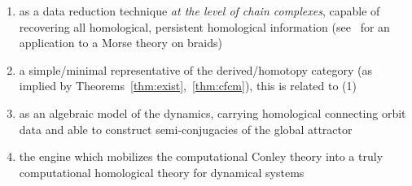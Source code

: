 \begin{enumerate}
\item as a data reduction technique {\em at the level of chain complexes}, capable of recovering all homological, persistent homological information (see~\cite{braids} for an application to a Morse theory on braids)
\item a simple/minimal representative of the derived/homotopy category (as implied by Theorems~\ref{thm:exist},~\ref{thm:cfcm}), this is related to (1)
\item as an algebraic model of the dynamics, carrying homological connecting orbit data and able to construct semi-conjugacies of the global attractor~\cite{scalar,dhmo,models}
\item the engine which mobilizes the computational Conley theory into a truly computational homological theory for dynamical systems

\end{enumerate}


